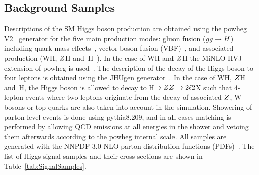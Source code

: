 \subsection{Background Samples}

Descriptions of the SM Higgs boson production are obtained using the 
{\sc powheg V2}~\cite{Alioli:2008gx,Nason:2004rx,Frixione:2007vw} generator for the five main production modes: 
gluon fusion ($gg\to H$) including quark mass effects~\cite{Bagnaschi:2011tu}, vector boson fusion 
(VBF)~\cite{Nason:2009ai}, and associated production (WH, $Z$H and \ttbar$\,$H~\cite{Hartanto:2015uka}). 
In the case of WH and $Z$H the {\sc MiNLO HVJ} extension of {\sc powheg} is used~\cite{Luisoni:2013kna}. 
The description of the decay of the Higgs boson to four leptons is obtained using the {\sc JHUgen} 
generator~\cite{Gao:2010qx}. In the case of WH, $Z$H and \ttbar$\,$H, the Higgs boson is allowed
to decay to H$\to Z Z \to 2\ell2$X such that 4-lepton events where two leptons originate from 
the decay of associated $Z$, W bosons or top quarks are also taken into account in the simulation. 
Showering of parton-level events is done using {\sc pythia8.209}, and in all cases matching is performed by 
allowing QCD emissions at all energies in the shower and vetoing them afterwards according to the 
{\sc powheg} internal scale. All samples are generated with the NNPDF 3.0 NLO parton distribution 
functions (PDFs)~\cite{Ball:2014uwa}. The list of Higgs signal samples and their cross sections are shown in 
Table~\ref{tab:SignalSamples}.

